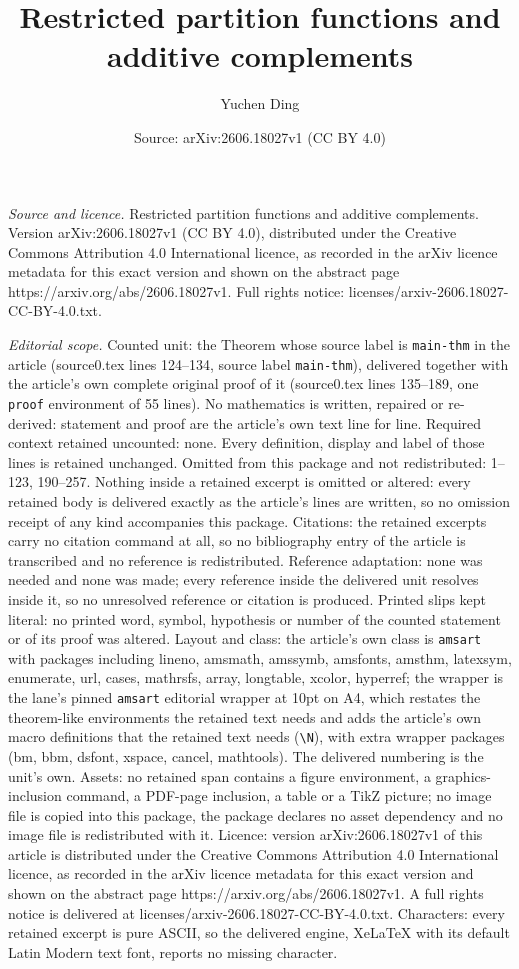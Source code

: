\documentclass[10pt,a4paper]{amsart}
\title[Restricted partition functions and additive complements]{Restricted partition functions and additive complements}
\author{Yuchen Ding}
\date{Source: arXiv:2606.18027v1 (CC BY 4.0)}
\begin{document}
\maketitle

\noindent\emph{Source and licence.} Restricted partition functions and additive complements. Version arXiv:2606.18027v1 (CC BY 4.0), distributed under the Creative Commons Attribution 4.0 International licence, as recorded in the arXiv licence metadata for this exact version and shown on the abstract page https://arxiv.org/abs/2606.18027v1. Full rights notice: licenses/arxiv-2606.18027-CC-BY-4.0.txt.\par\smallskip

\noindent\textit{Editorial scope.} Counted unit: the Theorem whose source label is \texttt{main-thm} in the article (source0.tex lines 124--134, source label \texttt{main-thm}), delivered together with the article's own complete original proof of it (source0.tex lines 135--189, one \texttt{proof} environment of 55 lines). No mathematics is written, repaired or re-derived: statement and proof are the article's own text line for line. Required context retained uncounted: none. Every definition, display and label of those lines is retained unchanged. Omitted from this package and not redistributed: 1--123, 190--257. Nothing inside a retained excerpt is omitted or altered: every retained body is delivered exactly as the article's lines are written, so no omission receipt of any kind accompanies this package. Citations: the retained excerpts carry no citation command at all, so no bibliography entry of the article is transcribed and no reference is redistributed. Reference adaptation: none was needed and none was made; every reference inside the delivered unit resolves inside it, so no unresolved reference or citation is produced. Printed slips kept literal: no printed word, symbol, hypothesis or number of the counted statement or of its proof was altered. Layout and class: the article's own class is \texttt{amsart} with packages including lineno, amsmath, amssymb, amsfonts, amsthm, latexsym, enumerate, url, cases, mathrsfs, array, longtable, xcolor, hyperref; the wrapper is the lane's pinned \texttt{amsart} editorial wrapper at 10pt on A4, which restates the theorem-like environments the retained text needs and adds the article's own macro definitions that the retained text needs (\texttt{\textbackslash N}), with extra wrapper packages (bm, bbm, dsfont, xspace, cancel, mathtools). The delivered numbering is the unit's own. Assets: no retained span contains a figure environment, a graphics-inclusion command, a PDF-page inclusion, a table or a TikZ picture; no image file is copied into this package, the package declares no asset dependency and no image file is redistributed with it. Licence: version arXiv:2606.18027v1 of this article is distributed under the Creative Commons Attribution 4.0 International licence, as recorded in the arXiv licence metadata for this exact version and shown on the abstract page https://arxiv.org/abs/2606.18027v1. A full rights notice is delivered at licenses/arxiv-2606.18027-CC-BY-4.0.txt. Characters: every retained excerpt is pure ASCII, so the delivered engine, XeLaTeX with its default Latin Modern text font, reports no missing character.
\end{document}
